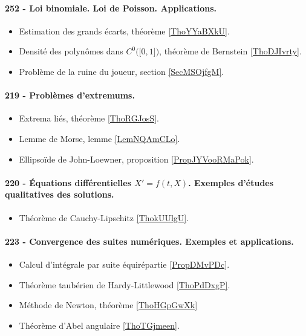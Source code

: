 \paragraph{252 - Loi binomiale. Loi de Poisson. Applications.}
\begin{itemize}
    \item Estimation des grands écarts, théorème \ref{ThoYYaBXkU}.
    \item Densité des polynômes dans \( C^0\big( \mathopen[ 0 , 1 \mathclose] \big)\), théorème de Bernstein \ref{ThoDJIvrty}.
    \item Problème de la ruine du joueur, section \ref{SecMSOjfgM}.
\end{itemize}
\paragraph{219 - Problèmes d'extremums.}
\begin{itemize}
    \item Extrema liés, théorème \ref{ThoRGJosS}.
    \item Lemme de Morse, lemme \ref{LemNQAmCLo}.
    \item Ellipsoïde de John-Loewner, proposition \ref{PropJYVooRMaPok}.
\end{itemize}
\paragraph{220 - Équations différentielles $X' = f (t , X )$. Exemples d’études qualitatives des solutions.}
\begin{itemize}
    \item Théorème de Cauchy-Lipschitz \ref{ThokUUlgU}.
\end{itemize}
\paragraph{223 - Convergence des suites numériques. Exemples et applications.}
\begin{itemize}
    \item Calcul d'intégrale par suite équirépartie \ref{PropDMvPDc}.
    \item Théorème taubérien de Hardy-Littlewood \ref{ThoPdDxgP}.
    \item Méthode de Newton, théorème \ref{ThoHGpGwXk}
    \item Théorème d'Abel angulaire \ref{ThoTGjmeen}.
\end{itemize}
